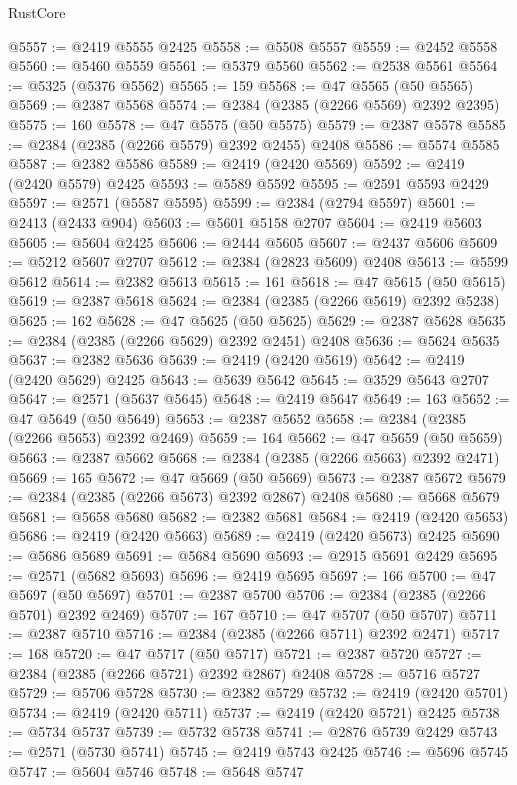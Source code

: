 \begin{lexlean}{RustCore}
\begin{coremodule}
@5557 := @2419 @5555 @2425
@5558 := @5508 @5557
@5559 := @2452 @5558
@5560 := @5460 @5559
@5561 := @5379 @5560
@5562 := @2538 @5561
@5564 := @5325 (@5376 @5562)
@5565 := 159
@5568 := @47 @5565 (@50 @5565)
@5569 := @2387 @5568
@5574 := @2384 (@2385 (@2266 @5569) @2392 @2395)
@5575 := 160
@5578 := @47 @5575 (@50 @5575)
@5579 := @2387 @5578
@5585 := @2384 (@2385 (@2266 @5579) @2392 @2455) @2408
@5586 := @5574 @5585
@5587 := @2382 @5586
@5589 := @2419 (@2420 @5569)
@5592 := @2419 (@2420 @5579) @2425
@5593 := @5589 @5592
@5595 := @2591 @5593 @2429
@5597 := @2571 (@5587 @5595)
@5599 := @2384 (@2794 @5597)
@5601 := @2413 (@2433 @904)
@5603 := @5601 @5158 @2707
@5604 := @2419 @5603
@5605 := @5604 @2425
@5606 := @2444 @5605
@5607 := @2437 @5606
@5609 := @5212 @5607 @2707
@5612 := @2384 (@2823 @5609) @2408
@5613 := @5599 @5612
@5614 := @2382 @5613
@5615 := 161
@5618 := @47 @5615 (@50 @5615)
@5619 := @2387 @5618
@5624 := @2384 (@2385 (@2266 @5619) @2392 @5238)
@5625 := 162
@5628 := @47 @5625 (@50 @5625)
@5629 := @2387 @5628
@5635 := @2384 (@2385 (@2266 @5629) @2392 @2451) @2408
@5636 := @5624 @5635
@5637 := @2382 @5636
@5639 := @2419 (@2420 @5619)
@5642 := @2419 (@2420 @5629) @2425
@5643 := @5639 @5642
@5645 := @3529 @5643 @2707
@5647 := @2571 (@5637 @5645)
@5648 := @2419 @5647
@5649 := 163
@5652 := @47 @5649 (@50 @5649)
@5653 := @2387 @5652
@5658 := @2384 (@2385 (@2266 @5653) @2392 @2469)
@5659 := 164
@5662 := @47 @5659 (@50 @5659)
@5663 := @2387 @5662
@5668 := @2384 (@2385 (@2266 @5663) @2392 @2471)
@5669 := 165
@5672 := @47 @5669 (@50 @5669)
@5673 := @2387 @5672
@5679 := @2384 (@2385 (@2266 @5673) @2392 @2867) @2408
@5680 := @5668 @5679
@5681 := @5658 @5680
@5682 := @2382 @5681
@5684 := @2419 (@2420 @5653)
@5686 := @2419 (@2420 @5663)
@5689 := @2419 (@2420 @5673) @2425
@5690 := @5686 @5689
@5691 := @5684 @5690
@5693 := @2915 @5691 @2429
@5695 := @2571 (@5682 @5693)
@5696 := @2419 @5695
@5697 := 166
@5700 := @47 @5697 (@50 @5697)
@5701 := @2387 @5700
@5706 := @2384 (@2385 (@2266 @5701) @2392 @2469)
@5707 := 167
@5710 := @47 @5707 (@50 @5707)
@5711 := @2387 @5710
@5716 := @2384 (@2385 (@2266 @5711) @2392 @2471)
@5717 := 168
@5720 := @47 @5717 (@50 @5717)
@5721 := @2387 @5720
@5727 := @2384 (@2385 (@2266 @5721) @2392 @2867) @2408
@5728 := @5716 @5727
@5729 := @5706 @5728
@5730 := @2382 @5729
@5732 := @2419 (@2420 @5701)
@5734 := @2419 (@2420 @5711)
@5737 := @2419 (@2420 @5721) @2425
@5738 := @5734 @5737
@5739 := @5732 @5738
@5741 := @2876 @5739 @2429
@5743 := @2571 (@5730 @5741)
@5745 := @2419 @5743 @2425
@5746 := @5696 @5745
@5747 := @5604 @5746
@5748 := @5648 @5747

\end{coremodule}
\end{lexlean}
